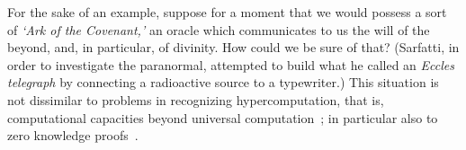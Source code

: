 For the sake of an example, suppose for a moment that
we would possess a sort of {\em `Ark of the Covenant,'}
an oracle which communicates to us the will of the beyond, and, in particular, of divinity.
How could we be sure of that?  (Sarfatti, in order to investigate the paranormal, attempted to build what he called an  {\em  Eccles telegraph} by connecting a
radioactive source to a typewriter.)
This situation is not dissimilar to problems in recognizing hypercomputation, that is,
computational capacities beyond universal computation~\cite{2007-hc};
in particular also to zero knowledge proofs~\cite{blum-86,Quisquater1990}.
